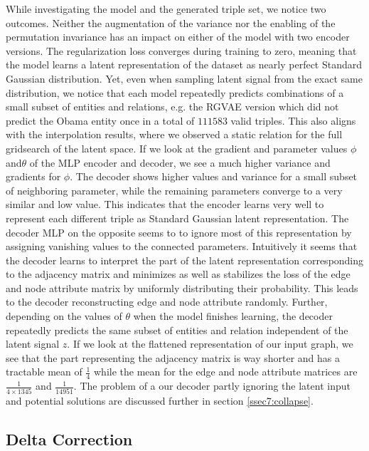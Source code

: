 While investigating the model and the generated triple set, we notice two outcomes. Neither the augmentation of the variance nor the enabling of the permutation invariance has an impact on either of the model with two encoder versions. The regularization loss converges during training to zero, meaning that the model learns a latent representation of the dataset as  nearly perfect Standard Gaussian distribution. Yet, even when sampling latent signal from the exact same distribution, we notice that each model repeatedly predicts combinations of a small subset of entities and relations, e.g. the RGVAE version which did not predict the Obama entity once in a total of $111583$ valid triples. This also aligns with the interpolation results, where we observed a static relation for the full gridsearch of the latent space. If we look at the gradient and parameter values $\phi$ and$\theta$ of the MLP encoder and decoder, we see a much higher variance and gradients for $\phi$. The decoder shows higher values and variance for a small subset of neighboring parameter, while the remaining parameters converge to a very similar and low value. This indicates that the encoder learns very well to represent each different triple as Standard Gaussian latent representation. The decoder MLP on the opposite seems to to ignore most of this representation by assigning vanishing values to the connected parameters. Intuitively it seems that the decoder learns to interpret the part of the latent representation corresponding to the adjacency matrix and minimizes as well as stabilizes the loss of the edge and node attribute matrix by uniformly distributing their probability. This leads to the decoder reconstructing edge and node attribute randomly. Further, depending on the values of $\theta$ when the model finishes learning, the decoder repeatedly predicts the same subset of entities and relation independent of the latent signal $z$. If we look at the flattened representation of our input graph, we see that the part representing the adjacency matrix is way shorter and has a tractable mean of $\frac{1}{4}$ while the mean for the edge and node attribute matrices are $\frac{1}{{4 \times 1345}}$ and $\frac{1}{14951}$. The problem of a our decoder partly ignoring the latent input and potential solutions are discussed further in section \ref{ssec7:collapse}. 


\subsection{Delta Correction}
\label{ssec5:delta}

